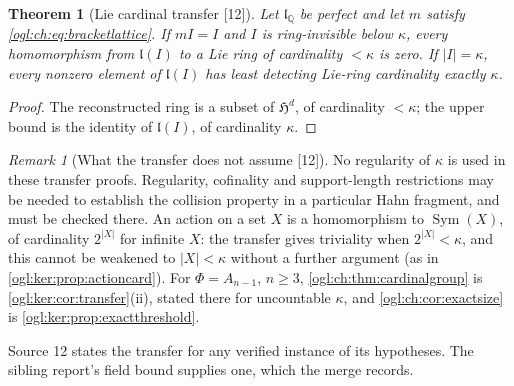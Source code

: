\documentclass[11pt,oneside]{article}
\numberwithin{equation}{section}
\newtheorem{theorem}{Theorem}[section]
\theoremstyle{definition}
\theoremstyle{remark}
\newtheorem{remark}[remark]{Remark}
\newcommand{\Q}{\mathbb Q}
\newcommand{\Sym}{\operatorname{Sym}}
\newcommand{\src}[1]{\textup{\textsf{\small[#1]}}}
\begin{document}
\begin{theorem}[Lie cardinal transfer \src{12}]\label{ogl:ch:thm:cardinallie}
Let $\mathfrak l_\Q$ be perfect and let $m$ satisfy \eqref{ogl:ch:eq:bracketlattice}.
If $mI=I$ and $I$ is ring-invisible below $\kappa$, every homomorphism from
$\mathfrak l(I)$ to a Lie ring of cardinality $<\kappa$ is zero. If $|I|=\kappa$,
every nonzero element of $\mathfrak l(I)$ has least detecting Lie-ring cardinality
exactly $\kappa$.
\end{theorem}
\begin{proof}
The reconstructed ring is a subset of $\mathfrak H^d$, of cardinality $<\kappa$;
the upper bound is the identity of $\mathfrak l(I)$, of cardinality $\kappa$.
\end{proof}

\begin{remark}[What the transfer does not assume \src{12}]\label{ogl:ch:rem:transfer}
No regularity of $\kappa$ is used in these transfer proofs. Regularity,
cofinality and support-length restrictions may be needed to establish the
collision property in a particular Hahn fragment, and must be checked there. An
action on a set $X$ is a homomorphism to $\Sym(X)$, of cardinality $2^{|X|}$ for
infinite $X$: the transfer gives triviality when $2^{|X|}<\kappa$, and this cannot
be weakened to $|X|<\kappa$ without a further argument (as in
\cref{ogl:ker:prop:actioncard}). For $\Phi=A_{n-1}$, $n\ge3$,
\cref{ogl:ch:thm:cardinalgroup} is \cref{ogl:ker:cor:transfer}(ii), stated there
for uncountable $\kappa$, and \cref{ogl:ch:cor:exactsize} is
\cref{ogl:ker:prop:exactthreshold}.
\end{remark}

Source 12 states the transfer for any verified instance of its hypotheses. The
sibling report's field bound supplies one, which the merge records.
\end{document}
